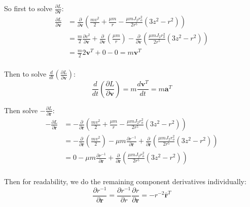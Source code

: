 \documentclass[titlepage]{article}
\begin{document}
So first to solve $\frac{\partial L}{\partial\boldsymbol{v}}$:
\begin{equation}
	\begin{split}
		\frac{\partial L}{\partial\boldsymbol{v}}&=\frac{\partial}{\partial\boldsymbol{v}}\left(\frac{mv^2}{2}+\frac{\mu m}{r}-\frac{\mu mJ_2r_o^2}{2r^5}\left(3z^2-r^2\right)\right) \\
		&=\frac{m}{2}\frac{\partial v^2}{\partial\boldsymbol{v}}+\frac{\partial}{\partial\boldsymbol{v}}\left(\frac{\mu m}{r}\right)-\frac{\partial}{\partial\boldsymbol{v}}\left(\frac{\mu mJ_2r_o^2}{2r^5}\left(3z^2-r^2\right)\right) \\
		&=\frac{m}{2}2\boldsymbol{v}^T+0-0=m\boldsymbol{v}^T \\
	\end{split}
\end{equation}

Then to solve $\frac{d}{dt}\left(\frac{\partial L}{\partial\boldsymbol{v}}\right)$:
\begin{equation}
	\frac{d}{dt}\left(\frac{\partial L}{\partial\boldsymbol{v}}\right)=m\frac{d\boldsymbol{v}^T}{dt}=m\boldsymbol{a}^T 
\end{equation}

Then solve $-\frac{\partial L}{\partial\boldsymbol{r}}$:
\begin{equation}
	\begin{split}
		-\frac{\partial L}{\partial\boldsymbol{r}}&=-\frac{\partial}{\partial\boldsymbol{r}}\left(\frac{mv^2}{2}+\frac{\mu m}{r}-\frac{\mu mJ_2r_o^2}{2r^5}\left(3z^2-r^2\right)\right) \\
		&=-\frac{\partial}{\partial\boldsymbol{r}}\left(\frac{mv^2}{2}\right)-\mu m\frac{\partial r^{-1}}{\partial\boldsymbol{r}}+\frac{\partial}{\partial\boldsymbol{r}}\left(\frac{\mu mJ_2r_o^2}{2r^5}\left(3z^2-r^2\right)\right) \\
		&=0-\mu m\frac{\partial r^{-1}}{\partial\boldsymbol{r}}+\frac{\partial}{\partial\boldsymbol{r}}\left(\frac{\mu mJ_2r_o^2}{2r^5}\left(3z^2-r^2\right)\right) \\
	\end{split}
\end{equation}

Then for readability, we do the remaining component derivatives individually:
\begin{equation}
	\frac{\partial r^{-1}}{\partial\boldsymbol{r}}=\frac{\partial r^{-1}}{\partial r}\frac{\partial r}{\partial\boldsymbol{r}}=-r^{-2}\hat{\boldsymbol{r}}^T
\end{equation}
\end{document}
